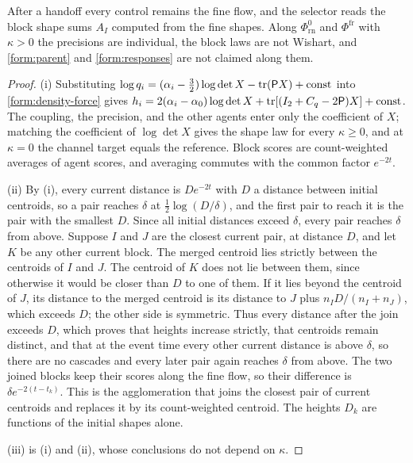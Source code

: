 After a handoff every control remains the fine flow, and the selector reads the block shape sums $A_I$ computed from the fine shapes. Along $\Phi^0_{\mathrm{rn}}$ and $\Phi^{\mathrm{fr}}$ with $\kappa>0$ the precisions are individual, the block laws are not Wishart, and \cref{form:parent} and \cref{form:responses} are not claimed along them.

\begin{proof}
(i) Substituting $\log q_i=(\alpha_i-\tfrac32)\log\det X-\operatorname{tr}(\mathsf PX)+\mathrm{const}$ into \cref{form:density-force} gives $h_i=2(\alpha_i-\alpha_0)\log\det X+\operatorname{tr}[(I_2+C_q-2\mathsf P)X]+\mathrm{const}$. The coupling, the precision, and the other agents enter only the coefficient of $X$; matching the coefficient of $\log\det X$ gives the shape law for every $\kappa\ge0$, and at $\kappa=0$ the channel target equals the reference. Block scores are count-weighted averages of agent scores, and averaging commutes with the common factor $e^{-2t}$.

(ii) By (i), every current distance is $De^{-2t}$ with $D$ a distance between initial centroids, so a pair reaches $\delta$ at $\tfrac12\log(D/\delta)$, and the first pair to reach it is the pair with the smallest $D$. Since all initial distances exceed $\delta$, every pair reaches $\delta$ from above. Suppose $I$ and $J$ are the closest current pair, at distance $D$, and let $K$ be any other current block. The merged centroid lies strictly between the centroids of $I$ and $J$. The centroid of $K$ does not lie between them, since otherwise it would be closer than $D$ to one of them. If it lies beyond the centroid of $J$, its distance to the merged centroid is its distance to $J$ plus $n_ID/(n_I+n_J)$, which exceeds $D$; the other side is symmetric. Thus every distance after the join exceeds $D$, which proves that heights increase strictly, that centroids remain distinct, and that at the event time every other current distance is above $\delta$, so there are no cascades and every later pair again reaches $\delta$ from above. The two joined blocks keep their scores along the fine flow, so their difference is $\delta e^{-2(t-t_k)}$. This is the agglomeration that joins the closest pair of current centroids and replaces it by its count-weighted centroid. The heights $D_k$ are functions of the initial shapes alone.

(iii) is (i) and (ii), whose conclusions do not depend on $\kappa$.


\end{proof}
